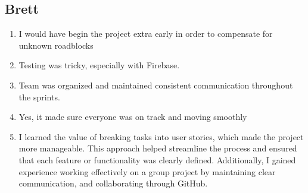 \subsection{Brett}
\begin{enumerate}
    \item I would have begin the project extra early in order to compensate for unknown roadblocks
    \item Testing was tricky, especially with Firebase.
    \item Team was organized and maintained consistent communication throughout the sprints.
    \item Yes, it made sure everyone was on track and moving smoothly
    \item I learned the value of breaking tasks into user stories, which made the project more manageable. This approach helped streamline the process and ensured that each feature or functionality was clearly defined. Additionally, I gained experience working effectively on a group project by maintaining clear communication, and collaborating through GitHub.
\end{enumerate}








